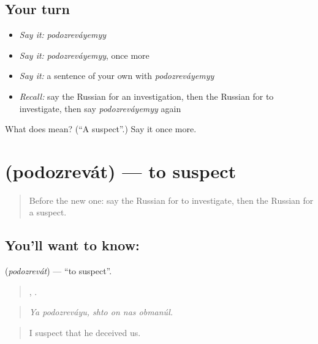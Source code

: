 \subsection*{Your turn}
\begin{itemize}
\raggedright
  \item \emph{Say it:} \emph{podozreváyemyy}
  \item \emph{Say it:} \emph{podozreváyemyy}, once more
  \item \emph{Say it:} a sentence of your own with \emph{podozreváyemyy}
  \item \emph{Recall:} say the Russian for an investigation, then the Russian for to investigate, then say \emph{podozreváyemyy} again
\end{itemize}

\begin{tcolorbox}[breakable,colback=teal!4,colframe=teal!35!black,title={Before you move on}]
What does  mean? (\textquotedblleft{}A suspect\textquotedblright{}.) Say it once more.
\end{tcolorbox}
\section[\texorpdfstring{\ru{подозревать} (podozrevát)}{подозревать (podozrevát)}]{ (podozrevát) — to suspect}

\label{lesson:RU-C291-podozrevat}



\begin{quote}
Before the new one: say the Russian for to investigate, then the Russian for a suspect.
\end{quote}

\subsection*{You'll want to know: }
\textbf{} (\emph{podozrevát}) — \textquotedblleft{}to suspect\textquotedblright{}.

\begin{quote}
 ,    .
\end{quote}

\begin{quote}
\emph{Ya podozreváyu, shto on nas obmanúl.}
\end{quote}

\begin{quote}
I suspect that he deceived us.
\end{quote}

